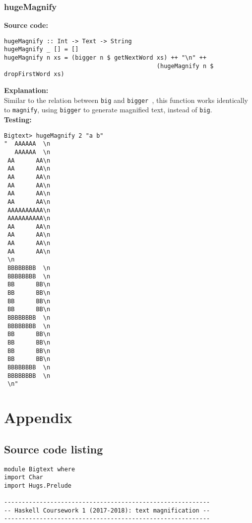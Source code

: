 \documentclass[11pt]{article}
\begin{document}
{\begin{verbatim}
\end{verbatim}

\newpage
\subsubsection{hugeMagnify}
\textbf{Source code:}
\begin{verbatim}
hugeMagnify :: Int -> Text -> String
hugeMagnify _ [] = []                                                                     
hugeMagnify n xs = (bigger n $ getNextWord xs) ++ "\n" ++
                                           (hugeMagnify n $ dropFirstWord xs)
\end{verbatim}

\textbf{Explanation:}\\
Similar to the relation between {\verb|big|} and {\verb|bigger |}, this function works identically to {\verb|magnify|}, using {\verb|bigger|} to generate magnified text, instead of {\verb|big|}.\\

\newpage
\textbf{Testing:}
\begin{verbatim}
Bigtext> hugeMagnify 2 "a b"
"  AAAAAA  \n
   AAAAAA  \n
 AA      AA\n
 AA      AA\n
 AA      AA\n
 AA      AA\n
 AA      AA\n
 AA      AA\n
 AAAAAAAAAA\n
 AAAAAAAAAA\n
 AA      AA\n
 AA      AA\n
 AA      AA\n
 AA      AA\n
 \n
 BBBBBBBB  \n
 BBBBBBBB  \n
 BB      BB\n
 BB      BB\n
 BB      BB\n
 BB      BB\n
 BBBBBBBB  \n
 BBBBBBBB  \n
 BB      BB\n
 BB      BB\n
 BB      BB\n
 BB      BB\n
 BBBBBBBB  \n
 BBBBBBBB  \n
 \n"
\end{verbatim}

\newpage 

\setlength{\headwidth}{\textwidth}

\section{Appendix}
\subsection{Source code listing}
\begin{verbatim}
module Bigtext where
import Char
import Hugs.Prelude

----------------------------------------------------------
-- Haskell Coursework 1 (2017-2018): text magnification --
----------------------------------------------------------


\end{verbatim}}
\end{document}
